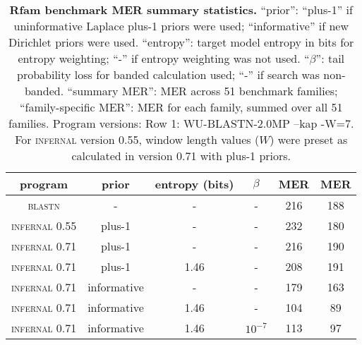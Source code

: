 \begin{table}[htb]
\begin{center}
\begin{tabular}{cccccc}
\multicolumn{1}{c}{program} &
\multicolumn{1}{c}{prior} & \multicolumn{1}{c}{entropy (bits)} &
\multicolumn{1}{c}{$\beta$} & \multicolumn{1}{c}{MER} &
\multicolumn{1}{c}{MER} \\ \hline
\textsc{blastn}         & -           & -    & -       & 216 & 188 \\
\textsc{infernal} 0.55  & plus-1      & -    & -       & 232 & 180 \\
\textsc{infernal} 0.71  & plus-1      & -    & -       & 216 & 190 \\
\textsc{infernal} 0.71  & plus-1      & 1.46 & -       & 208 & 191 \\
\textsc{infernal} 0.71  & informative & -    & -       & 179 & 163 \\
\textsc{infernal} 0.71  & informative & 1.46 & -       & 104 &  89 \\
\textsc{infernal} 0.71  & informative & 1.46 & $10^{-7}$ & 113 &  97 \\ 
\end{tabular}
\end{center}
\caption{\textbf{Rfam benchmark MER summary statistics.} 
    ``prior'': ``plus-1'' if uninformative Laplace plus-1 priors were
    used; ``informative'' if new Dirichlet priors were used.
    ``entropy'': target model entropy in bits for entropy weighting; ``-''
    if entropy weighting was not used.
    ``$\beta$'': tail probability loss for banded calculation used; ``-'' if search
    was non-banded. ``summary MER'': MER across 51 benchmark
    families; ``family-specific MER'': MER for each family, summed
    over all 51 families. Program versions: Row 1: WU-BLASTN-2.0MP
    --kap -W=7. For \textsc{infernal} version 0.55, window length values ($W$)
    were preset as calculated in version 0.71 with plus-1 priors.}
\label{tbl:rmarkmerlist}
\end{table}

